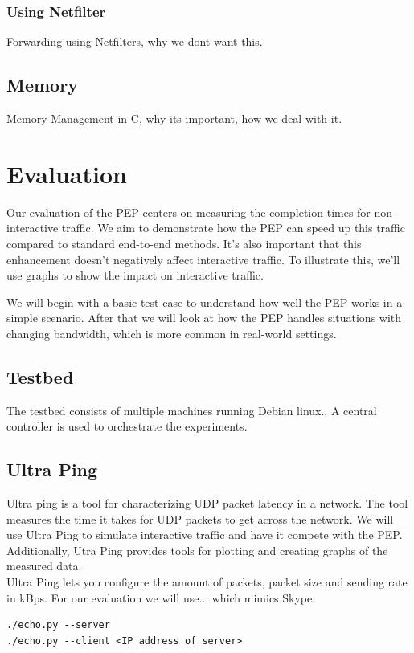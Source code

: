 \documentclass[a4paper,english, 11pt]{report}
\begin{document}
\subsection{Using Netfilter}
Forwarding using Netfilters, why we dont want this.


\section{Memory}
Memory Management in C, why its important, how we deal with it.

\chapter{Evaluation}
Our evaluation of the PEP centers on measuring the completion times for non-interactive traffic. We aim to demonstrate how the PEP can speed up this traffic compared to standard end-to-end methods. It's also important that this enhancement doesn't negatively affect interactive traffic. To illustrate this, we'll use graphs to show the impact on interactive traffic.

We will begin with a basic test case to understand how well the PEP works in a simple scenario. After that we will look at how the PEP handles situations with changing bandwidth, which is more common in real-world settings.

\section{Testbed}
The testbed consists of multiple machines running Debian linux..
A central controller is used to orchestrate the experiments.

\section{Ultra Ping}
Ultra ping is a tool for characterizing UDP packet latency in a network. The tool measures the time it takes for UDP packets to get across the network\cite{rahtz2023ultraping}. We will use Ultra Ping to simulate interactive traffic and have it compete with the PEP. Additionally, Utra Ping provides tools for plotting and creating graphs of the measured data.\\

Ultra Ping lets you configure the amount of packets, packet size and sending rate in kBps. For our evaluation we will use... which mimics Skype.

\begin{verbatim}
./echo.py --server
./echo.py --client <IP address of server>
\end{verbatim}
\end{document}
